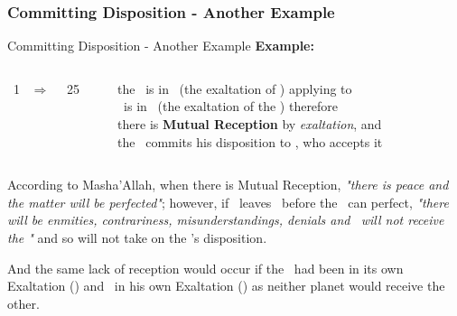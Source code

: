 \subsubsection{Committing Disposition - Another Example}
\begin{frame}[t]{Committing Disposition - Another Example}
\textbf{Example:}\footnotemark[1]
\begin{columns}[T, onlytextwidth]
\Sun\ 1 \Libra\ $\Rightarrow$ \Opposition\ \Saturn\ 25 \Aries

\rule{.1mm}{.20\textheight}

the \Sun\ is in \Libra\ (the exaltation of \Saturn) applying to \Opposition\ \Saturn \\
\Saturn\ is in \Aries\ (the exaltation of the \Sun) therefore \\
there is \textbf{Mutual Reception} by \textsl{exaltation}, and \\
the \Sun\ commits his disposition to \Saturn, who accepts it
\end{columns}
\vspace{0.25cm}
According to Masha'Allah, when there is Mutual Reception, \textsl{"there is peace and the matter will be perfected"}; however, if \Saturn\ leaves \Aries\ before the \Opposition\ can perfect, \textsl{"there will be enmities, contrariness, misunderstandings, denials and \Saturn\ will not receive the \Sun"} and so will not take on the \Sun's disposition.

And the same lack of reception would occur if the \Sun\ had been in its own Exaltation (\Aries) and \Saturn\ in his own Exaltation (\Libra) as neither planet would receive the other.

\end{frame}
